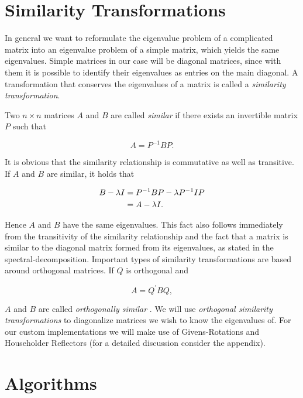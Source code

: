 \documentclass[12pt]{article}
\begin{document}
\section{Similarity Transformations}

In general we want to reformulate the eigenvalue problem of a complicated matrix into an eigenvalue problem of a simple matrix, which yields the same eigenvalues. Simple matrices in our case will be diagonal matrices, since with them it is possible to identify their eigenvalues as entries on the main diagonal. A transformation that conserves the eigenvalues of a matrix is called a \textit{similarity transformation}.

Two $n \times n$ matrices $A$ and $B$ are called \textit{similar} if there exists an invertible matrix $P$ such that

\begin{equation}
\label{similarity}
A = P^{-1} B P.
\end{equation}

It is obvious that the similarity relationship is commutative as well as transitive. If $A$ and $B$ are similar, it holds that

\begin{align*}
B - \lambda I &= P^{-1} B P - \lambda P^{-1} I P \notag \\
              &= A - \lambda I.
\end{align*}

 Hence $A$ and $B$ have the same eigenvalues. This fact also follows immediately from the transitivity of the similarity relationship and the fact that a matrix is similar to the diagonal matrix formed from its eigenvalues, as stated in the spectral-decomposition. Important types of similarity transformations are based around orthogonal matrices. If $Q$ is orthogonal and

$$ A = Q^{\prime} B Q, $$

$A$ and $B$ are called \textit{orthogonally similar} \citep{NLA}. We will use \textit{orthogonal similarity transformations} to diagonalize matrices we wish to know the eigenvalues of. For our custom implementations we will make use of Givens-Rotations and Householder Reflectors (for a detailed discussion consider the appendix).

\section{Algorithms}
\end{document}
